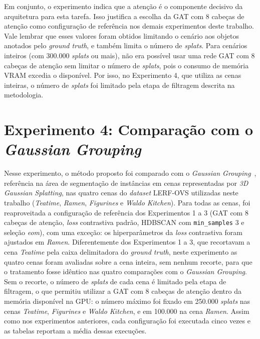Em conjunto, o experimento indica que a atenção é o componente decisivo da arquitetura para esta tarefa. Isso justifica a escolha da GAT com 8 cabeças de atenção como configuração de referência nos demais experimentos deste trabalho. Vale lembrar que esses valores foram obtidos limitando o cenário aos objetos anotados pelo \textit{ground truth}, e também limita o número de \emph{splats}. Para cenários inteiros (com 300.000 \emph{splats} ou mais), não era possível usar uma rede GAT com 8 cabeças de atenção sem limitar o número de \emph{splats}, pois o consumo de memória VRAM excedia o disponível. Por isso, no Experimento 4, que utiliza as cenas inteiras, o número de \emph{splats} foi limitado pela etapa de filtragem descrita na metodologia.



\section{Experimento 4: Comparação com o \textit{Gaussian Grouping}}

Nesse experimento, o método proposto foi comparado com o \textit{Gaussian Grouping}~\cite{ye2024gaussian}, referência na área de segmentação de instâncias em cenas representadas por \textit{3D Gaussian Splatting}, nas quatro cenas do \textit{dataset} LERF-OVS utilizadas neste trabalho (\textit{Teatime}, \textit{Ramen}, \textit{Figurines} e \textit{Waldo Kitchen}). Para todas as cenas, foi reaproveitada a configuração de referência dos Experimentos 1 a 3 (GAT com 8 cabeças de atenção, \textit{loss} contrastiva padrão, HDBSCAN com \texttt{min\_samples} 3 e seleção \textit{eom}), com uma exceção: os hiperparâmetros da \textit{loss} contrastiva foram ajustados em \textit{Ramen}. Diferentemente dos Experimentos 1 a 3, que recortavam a cena \textit{Teatime} pela caixa delimitadora do \textit{ground truth}, neste experimento as quatro cenas foram avaliadas sobre a cena inteira, sem nenhum recorte, para que o tratamento fosse idêntico nas quatro comparações com o \textit{Gaussian Grouping}. Sem o recorte, o número de \emph{splats} de cada cena é limitado pela etapa de filtragem, o que permitiu utilizar a GAT com 8 cabeças de atenção dentro da memória disponível na GPU: o número máximo foi fixado em 250.000 \emph{splats} nas cenas \textit{Teatime}, \textit{Figurines} e \textit{Waldo Kitchen}, e em 100.000 na cena \textit{Ramen}. Assim como nos experimentos anteriores, cada configuração foi executada cinco vezes e as tabelas reportam a média dessas execuções.

